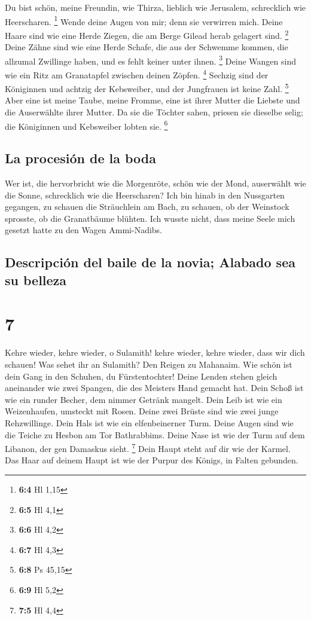  Du bist schön, meine Freundin, wie Thirza, lieblich wie
Jerusalem, schrecklich wie Heerscharen. \footnote{\textbf{6:4} Hl 1,15}
 Wende deine Augen von mir; denn sie verwirren mich. Deine
Haare sind wie eine Herde Ziegen, die am Berge Gilead herab gelagert
sind. \footnote{\textbf{6:5} Hl 4,1}  Deine Zähne sind wie
eine Herde Schafe, die aus der Schwemme kommen, die allzumal Zwillinge
haben, und es fehlt keiner unter ihnen. \footnote{\textbf{6:6} Hl 4,2}
 Deine Wangen sind wie ein Ritz am Granatapfel zwischen
deinen Zöpfen. \footnote{\textbf{6:7} Hl 4,3}  Sechzig
sind der Königinnen und achtzig der Kebsweiber, und der Jungfrauen ist
keine Zahl. \footnote{\textbf{6:8} Ps 45,15}  Aber eine
ist meine Taube, meine Fromme, eine ist ihrer Mutter die Liebste und die
Auserwählte ihrer Mutter. Da sie die Töchter sahen, priesen sie dieselbe
selig; die Königinnen und Kebsweiber lobten sie. \footnote{\textbf{6:9}
  Hl 5,2}

\hypertarget{la-procesiuxf3n-de-la-boda}{%
\subsection{La procesión de la boda}\label{la-procesiuxf3n-de-la-boda}}

 Wer ist, die hervorbricht wie die Morgenröte, schön wie
der Mond, auserwählt wie die Sonne, schrecklich wie die Heerscharen?
 Ich bin hinab in den Nussgarten gegangen, zu schauen die
Sträuchlein am Bach, zu schauen, ob der Weinstock sprosste, ob die
Granatbäume blühten.  Ich wusste nicht, dass meine Seele
mich gesetzt hatte zu den Wagen Ammi-Nadibs.

\hypertarget{descripciuxf3n-del-baile-de-la-novia-alabado-sea-su-belleza}{%
\subsection{Descripción del baile de la novia; Alabado sea su
belleza}\label{descripciuxf3n-del-baile-de-la-novia-alabado-sea-su-belleza}}

\hypertarget{section-6}{%
\section{7}\label{section-6}}

 Kehre wieder, kehre wieder, o Sulamith! kehre wieder,
kehre wieder, dass wir dich schauen! Was sehet ihr an Sulamith? Den
Reigen zu Mahanaim.  Wie schön ist dein Gang in den
Schuhen, du Fürstentochter! Deine Lenden stehen gleich aneinander wie
zwei Spangen, die des Meisters Hand gemacht hat.  Dein
Schoß ist wie ein runder Becher, dem nimmer Getränk mangelt. Dein Leib
ist wie ein Weizenhaufen, umsteckt mit Rosen.  Deine zwei
Brüste sind wie zwei junge Rehzwillinge.  Dein Hals ist
wie ein elfenbeinerner Turm. Deine Augen sind wie die Teiche zu Hesbon
am Tor Bathrabbims. Deine Nase ist wie der Turm auf dem Libanon, der gen
Damaskus sieht. \footnote{\textbf{7:5} Hl 4,4}  Dein Haupt
steht auf dir wie der Karmel. Das Haar auf deinem Haupt ist wie der
Purpur des Königs, in Falten gebunden.

